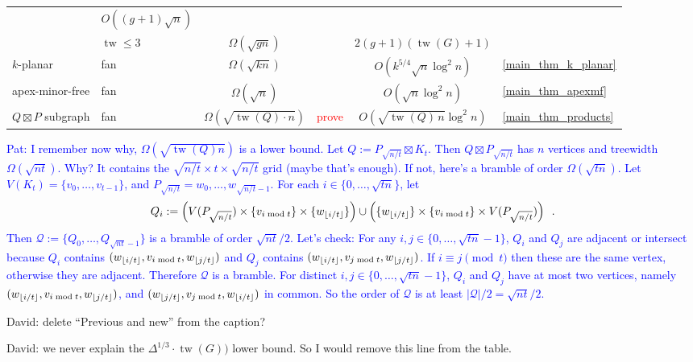 \documentclass{patmorin}
\renewcommand{\leq}{\leqslant}
\newcommand{\david}[1]{{\color{orange} David: #1}}
\newcommand{\pat}[1]{\textcolor{Blue}{Pat: #1}}
\DeclareMathOperator{\tw}{tw}
\begin{document}
\begin{table}[!ht]
\begin{tabular}{llclcl}
    & $O((g+1)\sqrt{n})$& \cite{distel.dujmovic.ea:product}\\[1.5ex]
     & $\tw\leq3$
     & $\Omega(\sqrt{gn})$ & \cite{gilbert.hutchinson.ea:separator}
     & $2(g+1)(\tw(G)+1)$ & \cite{ISW}\\
\midrule
    $k$-planar & fan
    & $\Omega(\sqrt{kn})$ & \cite{DEW17}
    & $O(k^{5/4}\sqrt{n}\log^2 n)$ & \cref{main_thm_k_planar}\\
\midrule
    apex-minor-free & fan
    & $\Omega(\sqrt{n})$ &
    & $O(\sqrt{n}\log^2 n)$ & \cref{main_thm_apexmf}\\
\midrule
    $Q\boxtimes P$ subgraph & fan
    & $\Omega(\sqrt{\tw(Q)\cdot n})$
    & \textcolor{red}{prove}
    & $O(\sqrt{\tw(Q)\,n}\log^2 n)$ & \cref{main_thm_products}\\
    \bottomrule
\end{tabular}
\label{results_table}
\end{table}

\pat{I remember now why, $\Omega(\sqrt{\tw(Q)n})$ is a lower bound. Let $Q:=P_{\sqrt{n/t}}\boxtimes K_t$.  Then $Q\boxtimes P_{\sqrt{n/t}}$ has $n$ vertices and treewidth $\Omega(\sqrt{nt})$.  Why? It contains the $\sqrt{n/t}\times t\times\sqrt{n/t}$ grid (maybe that's enough). If not, here's a bramble of order $\Omega(\sqrt{tn})$. Let $V(K_t)=\{v_0,\ldots,v_{t-1}\}$, and $P_{\sqrt{n/t}}=w_0,\ldots,w_{\sqrt{n/t}-1}$.  For each $i\in\{0,\ldots,\sqrt{tn}\}$, let
\[
   Q_i:=\left(V(P_{\sqrt{n/t}})\times\{v_{i\bmod t}\}\times\{w_{{\lfloor i/t \rfloor}}\}\right)
   \cup \left(\{w_{{\lfloor i/t \rfloor}}\}\times\{v_{i\bmod t}\}\times V(P_{\sqrt{n/t}})\right) \enspace .
\]
Then $\mathcal{Q}:=\{Q_0,\ldots,Q_{\sqrt{nt}-1}\}$ is a bramble of order $\sqrt{nt}/2$.  Let's check: For any $i,j\in\{0,\ldots,\sqrt{tn}-1\}$, $Q_i$ and $Q_j$ are adjacent or intersect because $Q_i$ contains $(w_{{\lfloor i/t \rfloor}},v_{i\bmod t},w_{{\lfloor j/t \rfloor}})$ and $Q_j$ contains $(w_{{\lfloor i/t \rfloor}},v_{j\bmod t},w_{{\lfloor j/t \rfloor}})$.  If $i\equiv j\pmod t$ then these are the same vertex, otherwise they are adjacent.  Therefore $\mathcal{Q}$ is a bramble.  For distinct $i,j\in\{0,\ldots,\sqrt{tn}-1\}$, $Q_i$ and $Q_j$ have at most two vertices, namely $(w_{{\lfloor i/t \rfloor}},v_{i\bmod t},w_{{\lfloor j/t \rfloor}})$, and $(w_{{\lfloor j/t \rfloor}},v_{j\bmod t},w_{{\lfloor i/t \rfloor}})$ in common. So the order of $\mathcal{Q}$ is at least $|\mathcal{Q}|/2=\sqrt{nt}/2$.
}

\david{delete ``Previous and new'' from the caption?}

\david{we never explain the $\Delta^{1/3}\cdot \tw(G))$ lower bound. So I would remove this line from the table. }
\end{document}

